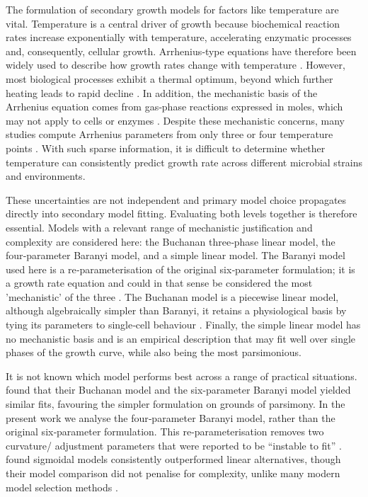 \documentclass[11pt]{article}
\begin{document}
The formulation of secondary growth models for factors like temperature are vital. 
Temperature is a central driver of growth because biochemical reaction rates increase 
exponentially with temperature, accelerating enzymatic processes and, consequently, cellular 
growth. Arrhenius‑type equations have therefore been widely used to describe how growth 
rates change with temperature \citep{peleg2012arrhenius}. However, most biological processes 
exhibit a thermal optimum, beyond which further heating leads to rapid 
decline \citep{arnoldi2025universal}. In addition, the mechanistic basis of the Arrhenius 
equation comes from gas‑phase reactions expressed in moles, which may not apply 
to cells or enzymes \citep{peleg2011microbial}. Despite these mechanistic concerns, many 
studies compute Arrhenius parameters from only three or four temperature points 
\citep{peleg2012arrhenius}. With such sparse information, it is difficult to determine 
whether temperature can consistently predict growth rate across different microbial strains 
and environments.


These uncertainties are not independent and primary model choice propagates directly into secondary model fitting. 
Evaluating both levels together is therefore essential.
Models with a relevant range of mechanistic justification and complexity are considered here: the 
Buchanan three‑phase linear model, the four‑parameter Baranyi model, and a simple linear 
model. The Baranyi model used here is a re‑parameterisation of the original six‑parameter 
formulation; 
it is a growth rate equation and could in that sense be considered the most 
'mechanistic' of the three \citep{baranyi1997simple}. The Buchanan model is a piecewise linear model, although 
algebraically simpler than Baranyi, it retains a physiological basis by tying its 
parameters to single‑cell behaviour \citep{buchanan1997simple}. Finally, the simple linear 
model has no mechanistic basis and is an empirical description that may fit well over 
single phases of the growth curve, while also being the most parsimonious.

It is not known which model performs best across a range of practical situations. 
\cite{buchanan1997simple} found that their Buchanan model and the six-parameter 
Baranyi model yielded similar fits, favouring the simpler formulation on grounds of parsimony. 
In the present work we analyse the four‑parameter Baranyi model, rather than the 
original six‑parameter formulation. This re‑parameterisation removes two curvature/
adjustment parameters that were reported to be “instable to fit” \citep{baranyi1997simple}. 
\citet{zwietering1990modeling} found sigmoidal models consistently outperformed linear alternatives, though their model comparison did not penalise for complexity, unlike many modern model selection methods \citep{johnson2004model}.
\end{document}
